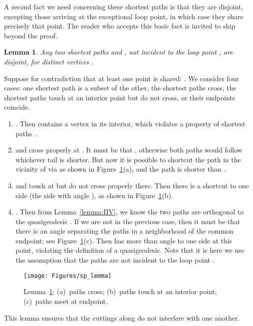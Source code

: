 \pdfoutput=1  \documentclass[]{article}
\newcommand{\ABox}{
\raisebox{3pt}{\framebox[6pt]{\rule{6pt}{0pt}}}
}
\newenvironment{proof}{{\bf Proof:}}{\hfill\ABox}
\newtheorem{lemma}[theorem]{Lemma}
\newcommand{\lemlab}[1]{\label{lemma:#1}}
\newcommand{\figlab}[1]{\label{fig:#1}}
\newcommand{\lemref}[1]{\ref{lemma:#1}}
\newcommand{\figref}[1]{\ref{fig:#1}}
\begin{document}
A second fact we need concerning these shortest paths is that they are disjoint,
excepting those arriving at the exceptional loop point,
in which case they share precisely that point.
The reader who accepts this basic fact is invited to skip beyond
the proof.
\begin{lemma}
Any two shortest paths 
 and ,
not incident to the loop point ,
are disjoint,
for distinct vertices .
\lemlab{sp.disjoint}
\end{lemma}
\begin{proof}
Suppose for contradiction that at least one point  is shared:
.
We consider four cases:
one shortest path is a subset of the other,
the shortest paths cross, the shortest paths touch at an interior point
but do not cross, or their endpoints coincide.
\begin{enumerate}
\item .
Then  contains a vertex  in its interior, which violates
a property of shortest paths~\cite[Lem.~4.1]{ss-spps-86}.
\item  and  cross properly at .
It must be that , otherwise both paths
would follow whichever tail is shorter.
But now it is possible to shortcut the path in the vicinity of  via
 as shown in 
Figure~\figref{sp_lemma}(a), and the path  is shorter than .
\item  and  touch at  but do not cross properly there.
Then there is a shortcut  to one side (the side with angle ),
as shown in 
Figure~\figref{sp_lemma}(b).
\item .
Then from Lemma~\lemref{IIV}, we know the two paths are orthogonal to the
quasigeodesic .  If we are not in the previous case, then it
must be that there is an angle  separating the paths in a neighborhood
of the common endpoint; see Figure~\figref{sp_lemma}(c).
Then  has more than  angle to one side at
this point, violating the definition of a quasigeodesic.
Note that it is here we use the assumption that the paths
are not incident to the loop point .
\end{enumerate}
\end{proof}


\begin{figure}[htbp]
\centering
\texttt{[image: Figures/sp\_lemma]}
\caption{Lemma~\protect\lemref{sp.disjoint}:
(a)~paths cross;
(b)~paths touch at an interior point;
(c)~paths meet at endpoint.}
\figlab{sp_lemma}
\end{figure}


This lemma ensures that the cuttings along  do not interfere
with one another.
\end{document}
